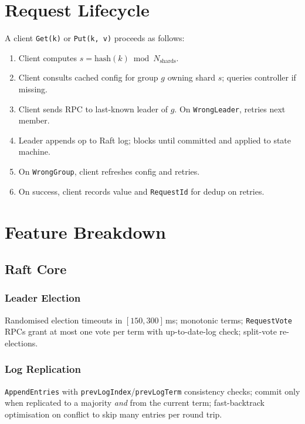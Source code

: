 \documentclass[11pt,a4paper]{article}
\begin{document}
\section{Request Lifecycle}

A client \texttt{Get(k)} or \texttt{Put(k, v)} proceeds as follows:

\begin{enumerate}[leftmargin=1.5em,itemsep=0.2em]
  \item Client computes $s = \text{hash}(k) \bmod N_{\text{shards}}$.
  \item Client consults cached config for group $g$ owning shard $s$; queries controller if missing.
  \item Client sends RPC to last-known leader of $g$. On \texttt{WrongLeader}, retries next member.
  \item Leader appends op to Raft log; blocks until committed and applied to state machine.
  \item On \texttt{WrongGroup}, client refreshes config and retries.
  \item On success, client records value and \texttt{RequestId} for dedup on retries.
\end{enumerate}

\section{Feature Breakdown}

\subsection{Raft Core}

\subsubsection{Leader Election}
Randomised election timeouts in $[150, 300]$\,ms; monotonic terms; \texttt{RequestVote} RPCs grant at most one vote per term with up-to-date-log check; split-vote re-elections.

\subsubsection{Log Replication}
\texttt{AppendEntries} with \texttt{prevLogIndex}/\texttt{prevLogTerm} consistency checks; commit only when replicated to a majority \textit{and} from the current term; fast-backtrack optimisation on conflict to skip many entries per round trip.
\end{document}
